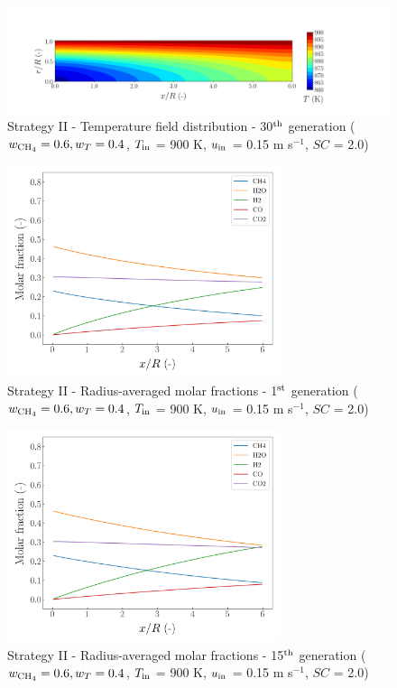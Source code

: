 \documentclass[preprint,12pt]{elsarticle}
\begin{document}
\begin{figure}[h!]
\centering
\includegraphics[width=190mm]{results/5Eq/60C_40T/GEN30-TFIELD.png}
\caption{\label{fig:5RES6040G30-TField} Strategy II - Temperature field distribution - 30$^{\rm{th}}$ generation ($w_{\rm{CH_4}} = 0.6, w_T = 0.4$, $T_{\rm{in}}$ = 900 K, $u_{\rm{in}}$ = 0.15 m s$^{-1}$, $SC$ = 2.0)}
\end{figure}


\begin{figure}[h!]
\centering
\includegraphics[width=80mm]{results/5Eq/60C_40T/GEN1-AVG.png}
\caption{\label{fig:5RES6040G1-avg} Strategy II - Radius-averaged molar fractions - 1$^{\rm{st}}$ generation ($w_{\rm{CH_4}} = 0.6, w_T = 0.4$, $T_{\rm{in}}$ = 900 K, $u_{\rm{in}}$ = 0.15 m s$^{-1}$, $SC$ = 2.0)}
\end{figure}

\begin{figure}[h!]
\centering
\includegraphics[width=80mm]{results/5Eq/60C_40T/GEN15-AVG.png}
\caption{\label{fig:5RES6040G15-avg} Strategy II - Radius-averaged molar fractions - 15$^{\rm{th}}$ generation ($w_{\rm{CH_4}} = 0.6, w_T = 0.4$, $T_{\rm{in}}$ = 900 K, $u_{\rm{in}}$ = 0.15 m s$^{-1}$, $SC$ = 2.0)}
\end{figure}
\end{document}

